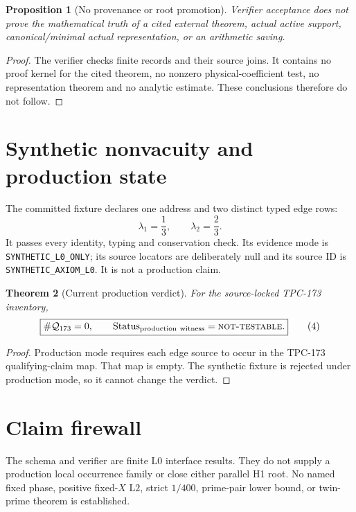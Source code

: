 \documentclass[11pt]{article}
\newtheorem{theorem}{Theorem}[section]
\newtheorem{proposition}[theorem]{Proposition}
\newcommand{\Lzero}{\mathrm{L0}}
\newcommand{\Ltwo}{\mathrm{L2}}
\newcommand{\NT}{\textnormal{\textsc{not-testable}}}
\begin{document}
\begin{proposition}[No provenance or root promotion]\label{prop:firewall}
Verifier acceptance does not prove the mathematical truth of a cited
external theorem, actual active support, canonical/minimal actual
representation, or an arithmetic saving.
\end{proposition}

\begin{proof}
The verifier checks finite records and their source joins.  It contains no
proof kernel for the cited theorem, no nonzero physical-coefficient test, no
representation theorem and no analytic estimate.  These conclusions
therefore do not follow.
\end{proof}

\section{Synthetic nonvacuity and production state}

The committed fixture declares one address and two distinct typed edge rows:
\[
 \lambda_1=\frac13,\qquad \lambda_2=\frac23.
\]
It passes every identity, typing and conservation check.  Its evidence mode
is \texttt{SYNTHETIC\_L0\_ONLY}; its source locators are deliberately null
and its source ID is \texttt{SYNTHETIC\_AXIOM\_L0}.  It is not a production
claim.

\begin{theorem}[Current production verdict]\label{thm:verdict}
For the source-locked TPC-173 inventory,
\[
 \boxed{
 \#\mathcal Q_{173}=0,\qquad
 \operatorname{Status}_{\rm production\ witness}=\NT.}
\tag{4}\label{eq:verdict}
\]
\end{theorem}

\begin{proof}
Production mode requires each edge source to occur in the TPC-173
qualifying-claim map.  That map is empty.  The synthetic fixture is rejected
under production mode, so it cannot change the verdict.
\end{proof}

\section{Claim firewall}

The schema and verifier are finite \(\Lzero\) interface results.  They do
not supply a production local occurrence family or close either parallel H1
root.  No named fixed phase, positive fixed-\(X\) \(\Ltwo\), strict
\(1/400\), prime-pair lower bound, or twin-prime theorem is established.



\end{document}
